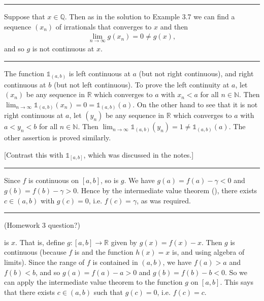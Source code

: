 \documentclass[letterpaper,10pt,english]{jupyterBook}
\begin{document}
\bigskip\hrule\bigskip


\sphinxAtStartPar
{\hyperref[\detokenize{Problems:id22}]{}} Suppose that \(x \in \mathbb{Q}\). Then as in the solution to Example 3.7 we can find a sequence \((x_{n})\) of irrationals that converges to \(x\) and then
\begin{equation*}
\begin{split}
\lim_{n\rightarrow\infty} g(x_{n}) = 0 \neq g(x),
\end{split}
\end{equation*}
\sphinxAtStartPar
and so \(g\) is not continuous at \(x\).


\bigskip\hrule\bigskip


\sphinxAtStartPar
{\hyperref[\detokenize{Problems:id23}]{}}

The function \(\mathbb{1}_{(a, b)}\) is left continuous at \(a\) (but not right continuous), and right continuous at \(b\) (but not left continuous).
To prove the left continuity at \(a\), let \((x_{n})\) be any sequence in \(\mathbb{R}\) which converges to \(a\) with \(x_{n} < a\) for all \(n\in\mathbb{N}\). Then \(\lim_{n\rightarrow\infty} \mathbb{1}_{(a, b)}(x_{n}) = 0 = \mathbb{1}_{(a, b)}(a).\) On the other hand to see that it is not right continuous at \(a\), let \((y_{n})\) be any sequence in \(\mathbb{R}\) which converges to \(a\) with \(a < y_{n} < b\) for all \(n\in\mathbb{N}\). Then
\( \lim_{n\rightarrow\infty} \mathbb{1}_{(a, b)}(y_{n}) = 1 \neq \mathbb{1}_{(a, b)}(a). \) The other assertion is proved similarly.

{[}Contrast this with \(\mathbb{1}_{[a, b]}\), which was discussed in the notes.{]}


\bigskip\hrule\bigskip


\sphinxAtStartPar
{\hyperref[\detokenize{Problems:id24}]{}} Since \(f\) is continuous on \([a, b]\), so is \(g\). We have \(g(a) = f(a) - \gamma < 0\) and \(g(b) = f(b) - \gamma > 0\). Hence by the intermediate value theorem (), there exists \(c \in (a, b)\) with \(g(c) = 0\), i.e. \(f(c) = \gamma\), as was required.


\bigskip\hrule\bigskip


\sphinxAtStartPar
{\hyperref[\detokenize{Problems:id25}]{}}
(Homework 3 question?)

 is \(x\). That is, define \(g:[a,b]\to\mathbb{R}\) given by \(g(x) = f(x) - x\). Then \(g\) is continuous (because \(f\) is and the function \(h(x)=x\) is, and using algebra of limits). Since the range of \(f\) is contained in \((a, b)\), we have \(f(a) > a\) and \(f(b) < b\), and so \(g(a) = f(a) - a > 0\) and \(g(b) = f(b) - b < 0\). So we can apply the intermediate value theorem to the function \(g\) on \([a,b]\). This says that there exists \(c \in (a, b)\) such that \(g(c) = 0\), i.e. \(f(c) = c\).
\end{document}
